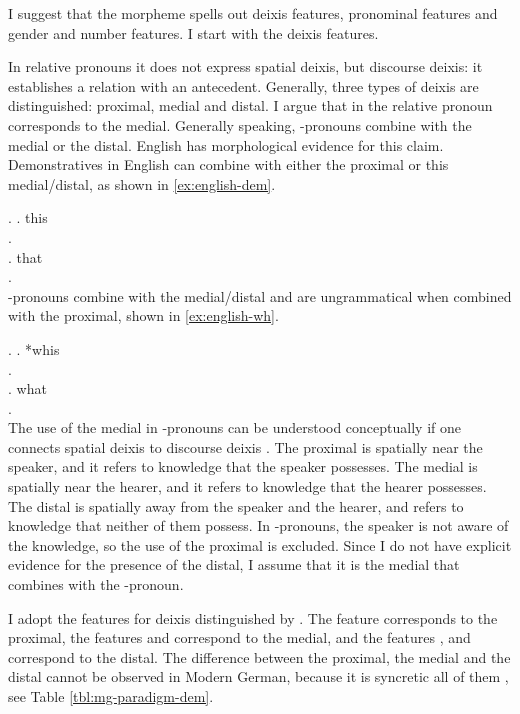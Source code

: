 I suggest that the morpheme  spells out deixis features, pronominal features and gender and number features. I start with the deixis features.

In relative pronouns it does not express spatial deixis, but discourse deixis: it establishes a relation with an antecedent.
Generally, three types of deixis are distinguished: proximal, medial and distal. I argue that  in the relative pronoun corresponds to the medial. Generally speaking, -pronouns combine with the medial or the distal. English has morphological evidence for this claim. Demonstratives in English can combine with either the proximal or this medial/distal, as shown in \ref{ex:english-dem}.

\ex.\label{ex:english-dem}
 \ag. this\\
 .\\
 \bg. that\\
 .\\

-pronouns combine with the medial/distal and are ungrammatical when combined with the proximal, shown in \ref{ex:english-wh}.

\ex.\label{ex:english-wh}
 \ag. *whis\\
 .\\
 \bg. what\\
 .\\

The use of the medial in -pronouns can be understood conceptually if one connects spatial deixis to discourse deixis \citep[cf.][]{colasanti2019}. The proximal is spatially near the speaker, and it refers to knowledge that the speaker possesses. The medial is spatially near the hearer, and it refers to knowledge that the hearer possesses. The distal is spatially away from the speaker and the hearer, and refers to knowledge that neither of them possess. In -pronouns, the speaker is not aware of the knowledge, so the use of the proximal is excluded. Since I do not have explicit evidence for the presence of the distal, I assume that it is the medial that combines with the -pronoun.

I adopt the features for deixis distinguished by \citet{lander2018}. The feature  corresponds to the proximal, the features  and  correspond to the medial, and the features ,  and  correspond to the distal.
The difference between the proximal, the medial and the distal cannot be observed in Modern German, because it is syncretic all of them , see Table \ref{tbl:mg-paradigm-dem}.

